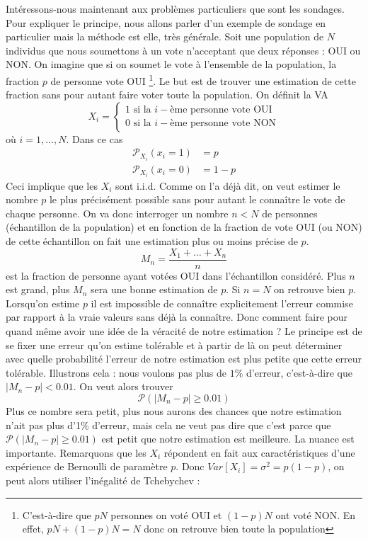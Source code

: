 \documentclass[a4paper,12pt]{report}
\theoremstyle{definition}
\renewcommand{\(}{\left(}
\renewcommand{\)}{\right)}
\renewcommand{\P}{\mathcal{P}}
\renewcommand{\t}{\text}
\begin{document}
        Intéressons-nous maintenant aux problèmes particuliers que sont les sondages. Pour expliquer le principe, nous allons parler d'un exemple de sondage en particulier mais la méthode est elle, très générale. Soit une population de $N$ individus que nous soumettons à un vote n'acceptant que deux réponses : OUI ou NON. On imagine que si on soumet le vote à l'ensemble de la population, la fraction $p$ de personne vote OUI \footnote{C'est-à-dire que $pN$ personnes on voté OUI et $(1-p)N$ ont voté NON. En effet, $pN + (1-p)N = N$ donc on retrouve bien toute la population}. Le but est de trouver une estimation de cette fraction sans pour autant faire voter toute la population. On définit la VA
        $$X_i = \begin{cases}
        1 \t{ si la }i-\t{ème personne vote OUI}\\
        0 \t{ si la }i-\t{ème personne vote NON}
        \end{cases}$$
        où $i=1,\dots,N$. Dans ce cas
        \begin{align*}
            \P_{X_i}(x_i=1) &= p \\
            \P_{X_i}(x_i=0) &= 1-p
        \end{align*}
        Ceci implique que les $X_i$ sont i.i.d. Comme on l'a déjà dit, on veut estimer le nombre $p$ le plus précisément possible sans pour autant le connaître le vote de chaque personne. On va donc interroger un nombre $n<N$ de personnes (échantillon de la population) et en fonction de la fraction de vote OUI (ou NON) de cette échantillon on fait une estimation plus ou moins précise de $p$.
        $$M_n = \frac{X_1+\dots+X_n}{n}$$
        est la fraction de personne ayant votées OUI dans l'échantillon considéré. Plus $n$ est grand, plus $M_n$ sera une bonne estimation de $p$. Si $n=N$ on retrouve bien $p$. Lorsqu'on estime $p$ il est impossible de connaître explicitement l'erreur commise par rapport à la vraie valeurs sans déjà la connaître. Donc comment faire pour quand même avoir une idée de la véracité de notre estimation ? Le principe est de se fixer une erreur qu'on estime tolérable et à partir de là on peut déterminer avec quelle probabilité l'erreur de notre estimation est plus petite que cette erreur tolérable. Illustrons cela : nous voulons pas plus de $1\%$ d'erreur, c'est-à-dire que $|M_n-p|<0.01$. On veut alors trouver $$\P(|M_n-p|\geq0.01)$$
        Plus ce nombre sera petit, plus nous aurons des chances que notre estimation n'ait pas plus d'1\% d'erreur, mais cela ne veut pas dire que c'est parce que $\P(|M_n-p|\geq0.01)$ est petit que notre estimation est meilleure. La nuance est importante. Remarquons que les $X_i$ répondent en fait aux caractéristiques d'une expérience de Bernoulli de paramètre $p$. Donc $Var[X_i] = \sigma^2 = p(1-p)$, on peut alors utiliser l'inégalité de Tchebychev :
\end{document}

